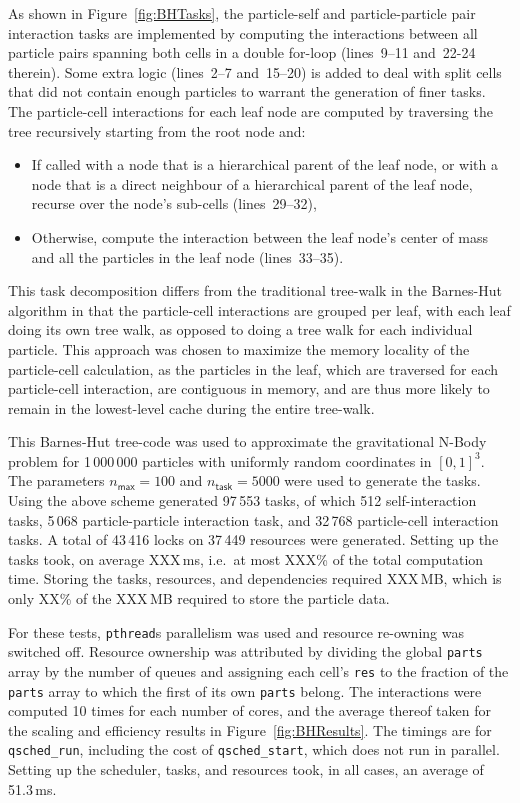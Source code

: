 \documentclass[fleqn,10pt]{wlpeerj}
\newcommand{\fig}[1]
    {Figure~\ref{fig:#1}}
\begin{document}
As shown in \fig{BHTasks}, the particle-self and particle-particle pair
interaction tasks are implemented
by computing the interactions between all particle pairs spanning
both cells in a double for-loop (lines~9--11 and~22-24 therein).
Some extra logic (lines~2--7 and~15--20) is added to deal with
split cells that did not contain enough particles to warrant the
generation of finer tasks.
The particle-cell interactions for each leaf node are computed by
traversing the tree recursively starting from the root node and:
\begin{itemize}
  \item If called with a node that is a hierarchical parent of
    the leaf node, or with a node that is a direct neighbour of
    a hierarchical parent of the leaf node, recurse over the
    node's sub-cells (lines~29--32),
  \item Otherwise, compute the interaction between the leaf node's
    center of mass and all the particles in the leaf node (lines~33--35).
\end{itemize}

This task decomposition differs from the traditional tree-walk
in the Barnes-Hut algorithm in that the particle-cell interactions
are grouped per leaf, with each leaf doing its own tree walk,
as opposed to doing a tree walk for each individual particle.
This approach was chosen to maximize the memory locality
of the particle-cell calculation, as the particles in the leaf,
which are traversed for each particle-cell interaction, are
contiguous in memory, and are thus more likely to remain in the
lowest-level cache during the entire tree-walk.

This Barnes-Hut tree-code was used to approximate the gravitational
N-Body problem for 1\,000\,000 particles with uniformly random coordinates
in $[0,1]^3$.
The parameters $n_\mathsf{max}=100$ and $n_\mathsf{task}=5000$
were used to generate the tasks.
Using the above scheme generated 97\,553 tasks, of which
512 self-interaction tasks, 5\,068 particle-particle interaction
task, and 32\,768 particle-cell interaction tasks.
A total of 43\,416 locks on 37\,449 resources were generated.
Setting up the tasks took, on average XXX\,ms, i.e.~at most
XXX\% of the total computation time.
Storing the tasks, resources, and dependencies required XXX\,MB,
which is only XX\% of the XXX\,MB required to store the particle
data.

For these tests, {\tt pthread}s parallelism was used and resource
re-owning was switched off.
Resource ownership was attributed by dividing the global
{\tt parts} array by the number of queues and assigning each cell's
{\tt res} to the fraction of the {\tt parts} array to which
the first of its own {\tt parts} belong.
The interactions were computed 10 times for each number of
cores, and the average thereof taken for the scaling and
efficiency results in \fig{BHResults}.
The timings are for {\tt qsched\_run}, including the cost of
{\tt qsched\_start}, which does not run in parallel.
Setting up the scheduler, tasks, and resources took, in all
cases, an average of 51.3\,ms.
\end{document}
